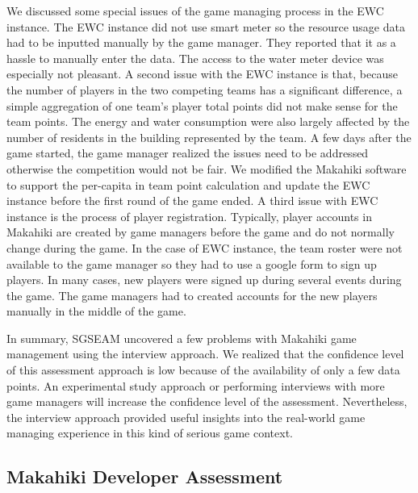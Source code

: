 We discussed some special issues of the game managing process in the EWC instance. The EWC instance did not use smart meter so the resource usage data had to be inputted manually by the game manager. They reported that it as a hassle to manually enter the data. The access to the water meter device was especially not pleasant.  A second issue with the EWC instance is that, because the number of players in the two competing teams has a significant difference, a simple aggregation of one team's player total points did not make sense for the team points. The energy and water consumption were also largely affected by the number of residents in the building represented by the team. A few days after the game started, the game manager realized the issues need to be addressed otherwise the competition would not be fair. We modified the Makahiki software to support the per-capita in team point calculation and update the EWC instance before the first round of the game ended. A third issue with EWC instance is the process of player registration. Typically, player accounts in Makahiki are created by game managers before the game and do not normally change during the game. In the case of EWC instance, the team roster were not available to the game manager so they had to use a google form to sign up players. In many cases, new players were signed up during several events during the game. The game managers had to created accounts for the new players manually in the middle of the game.

In summary, SGSEAM uncovered a few problems with Makahiki game management using the interview
approach. We realized that the confidence level of this assessment approach is low because of the availability of only a few data points. An experimental study approach or performing interviews with 
more game managers will increase the confidence level of the assessment. Nevertheless, the interview approach provided useful insights into the real-world game managing experience in this kind of serious game context.

\subsection{Makahiki Developer Assessment}
\label{sec:developer-in-lab-result} 

